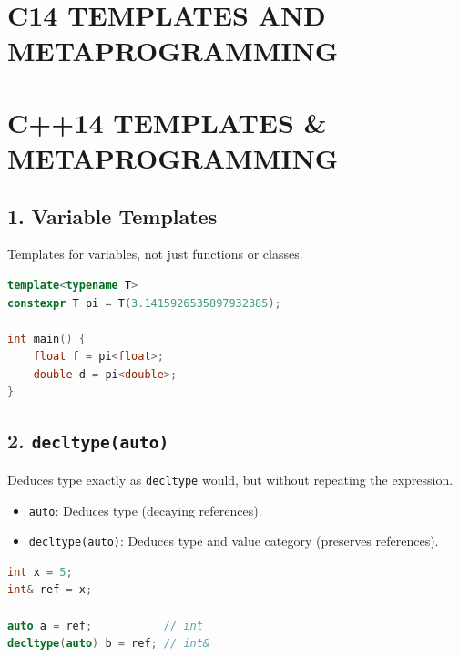 \hypertarget{c14-templates-and-metaprogramming}{%
\chapter{C14 TEMPLATES AND
METAPROGRAMMING}\label{c14-templates-and-metaprogramming}}

\hypertarget{c14-templates-metaprogramming}{%
\chapter{C++14 TEMPLATES \&
METAPROGRAMMING}\label{c14-templates-metaprogramming}}

\hypertarget{variable-templates}{%
\section{1. Variable Templates}\label{variable-templates}}

Templates for variables, not just functions or classes.

\begin{lstlisting}[language={C++}]
template<typename T>
constexpr T pi = T(3.1415926535897932385);

int main() {
    float f = pi<float>;
    double d = pi<double>;
}
\end{lstlisting}

\hypertarget{decltypeauto}{%
\section{\texorpdfstring{2.
\texttt{decltype(auto)}}{2. decltype(auto)}}\label{decltypeauto}}

Deduces type exactly as \passthrough{\lstinline!decltype!} would, but
without repeating the expression.

\begin{itemize}
\tightlist
\item
  \passthrough{\lstinline!auto!}: Deduces type (decaying references).
\item
  \passthrough{\lstinline!decltype(auto)!}: Deduces type and value
  category (preserves references).
\end{itemize}

\begin{lstlisting}[language={C++}]
int x = 5;
int& ref = x;

auto a = ref;           // int
decltype(auto) b = ref; // int&
\end{lstlisting}

